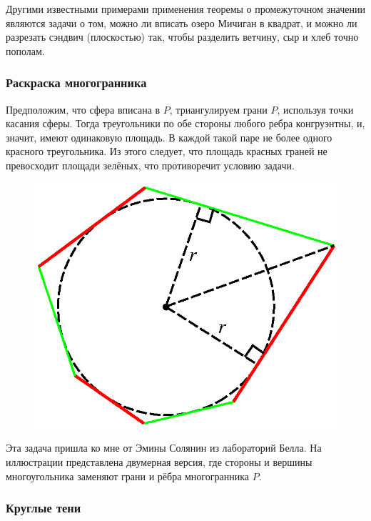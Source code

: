 Другими  известными примерами применения теоремы о промежуточном значении являются задачи о том, можно ли вписать озеро Мичиган в квадрат, и можно ли  разрезать сэндвич (плоскостью) так, чтобы разделить ветчину, сыр и хлеб точно пополам.

\subsubsection*{Раскраска многогранника}%

Предположим, что сфера вписана в $P$, триангулируем грани $P$, используя точки касания сферы.
Тогда треугольники по обе стороны любого ребра конгруэнтны, и, значит, имеют одинаковую площадь.
В каждой такой паре не более одного красного треугольника.
Из этого следует, что площадь красных граней не превосходит площади зелёных, что противоречит условию задачи.\heart

\begin{figure}[h!]
\centering
\includegraphics[scale=0.5]{Figs/Geometry/polygon}
\end{figure}%

Эта задача пришла ко мне от Эмины Солянин %
из лабораторий Белла.
На иллюстрации представлена двумерная версия, где стороны и вершины многоугольника заменяют грани и рёбра многогранника $P$.

\subsubsection*{Круглые тени}%

